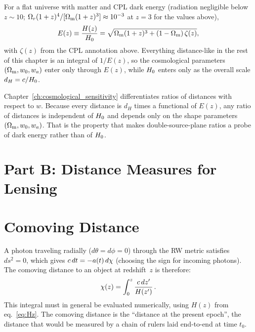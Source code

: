 \begin{annotation}
For a flat universe with matter and CPL dark energy (radiation negligible below
$z \sim 10$; $\Omega_r(1+z)^4/[\Omega_{\mathrm{m}}(1+z)^3] \approx 10^{-3}$ at $z = 3$ for
the values above),
\[
  E(z) \equiv \frac{H(z)}{H_0}
  = \sqrt{\Omega_{\mathrm{m}}(1+z)^3 + (1-\Omega_{\mathrm{m}})\,\zeta(z)} ,
\]
with $\zeta(z)$ from the CPL annotation above.  Everything distance-like in the
rest of this chapter is an integral of $1/E(z)$, so the cosmological parameters
$(\Omega_{\mathrm{m}}, w_0, w_a)$ enter only through $E(z)$, while $H_0$ enters only as
the overall scale $d_H = c/H_0$.
\end{annotation}

\begin{bridge}
Chapter~\ref{ch:cosmological_sensitivity} differentiates ratios of distances
with respect to $w$.  Because every distance is $d_H$ times a functional of
$E(z)$, any ratio of distances is independent of $H_0$ and depends only on
the shape parameters $(\Omega_{\mathrm{m}}, w_0, w_a)$.  That is the property that makes
double-source-plane ratios a probe of dark energy rather than of $H_0$.
\end{bridge}


\section*{Part B: Distance Measures for Lensing}

\section{Comoving Distance}
\label{sec:comoving_distance}

A photon traveling radially ($d\theta = d\phi = 0$) through the RW
metric satisfies $ds^2 = 0$, which gives
$c\, dt = -a(t)\, d\chi$ (choosing the sign for incoming
photons).  The comoving distance to an object at redshift~$z$
is therefore:
\begin{equation}
    \chi(z) = \int_0^z \frac{c\, dz'}{H(z')} \,.
    \label{eq:comoving_distance}
\end{equation}
This integral must in general be evaluated numerically, using
$H(z)$ from eq.~\eqref{eq:Hz}.  The comoving distance is the
``distance at the present epoch'', the distance that would be
measured by a chain of rulers laid end-to-end at time $t_0$.

